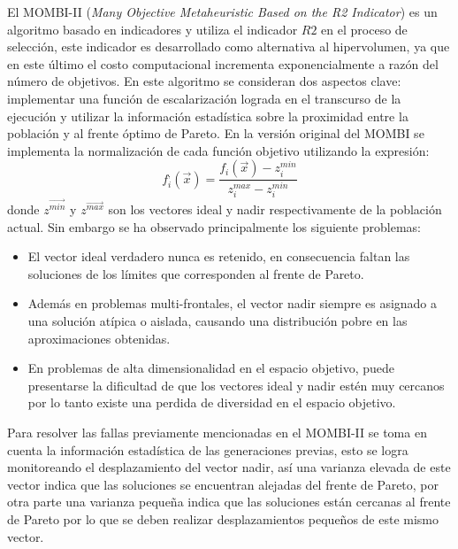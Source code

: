 %
El MOMBI-II (\textit{Many Objective Metaheuristic Based on the R2 Indicator}) es un algoritmo basado en indicadores y utiliza el indicador $R2$ en el proceso de selección, este indicador es desarrollado como alternativa al hipervolumen, ya que en este último el costo computacional incrementa exponencialmente a razón del número de objetivos.
%
En este algoritmo se consideran dos aspectos clave: implementar una función de escalarización lograda en el transcurso de la ejecución y utilizar la información estadística sobre la proximidad entre la población y al frente óptimo de Pareto.
%
En la versión original del MOMBI se implementa la normalización de cada función objetivo utilizando la expresión:
\begin{equation*}
f^,_i(\vec{x}) = \frac{f_i(\vec{x}) - z_i^{min}}{ z_i^{max} - z_i^{min}}
\end{equation*}
donde $z^{\vec{min}}$ y $z^{\vec{max}}$ son los vectores ideal y nadir respectivamente de la población actual.
%
Sin embargo se ha observado principalmente los siguiente problemas:
\begin{itemize}
\item El vector ideal verdadero nunca es retenido, en consecuencia faltan las soluciones de los límites que corresponden al frente de Pareto.
\item Además en problemas multi-frontales, el vector nadir siempre es asignado a una solución atípica o aislada, causando una distribución pobre en las aproximaciones obtenidas.
\item En problemas de alta dimensionalidad en el espacio objetivo, puede presentarse la dificultad de que los vectores ideal y nadir estén muy cercanos por lo tanto existe una perdida de diversidad en el espacio objetivo. 
\end{itemize}
%
Para resolver las fallas previamente mencionadas en el MOMBI-II se toma en cuenta la información estadística de las generaciones previas, esto se logra monitoreando el desplazamiento del vector nadir, así una varianza elevada de este vector indica que las soluciones se encuentran alejadas del frente de Pareto, por otra parte una varianza pequeña indica que las soluciones están cercanas al frente de Pareto por lo que se deben realizar desplazamientos pequeños de este mismo vector.
%

